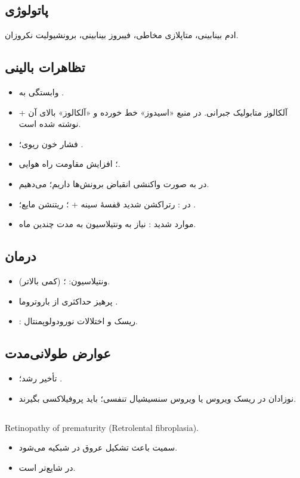 \documentclass[12pt,a4paper]{article}
\begin{document}
\subsection*{پاتولوژی }
ادم بینابینی، متاپلازی مخاطی، فیبروز بینابینی، برونشیولیت نکروزان.

\subsection*{تظاهرات بالینی }
\begin{itemize}
\item وابستگی به .
\item {} + آلکالوز متابولیک جبرانی. در منبع «اسیدوز» خط خورده و «آلکالوز» بالای آن نوشته شده است.
\item فشار خون ریوی؛ .
\item {}؛ افزایش مقاومت راه هوایی.
\item در  به صورت واکنشی انقباض برونش‌ها داریم؛  می‌دهیم.
\item در : رتراکشن شدید قفسهٔ سینه + ؛ ریتنشن مایع؛ .
\item موارد شدید : نیاز به ونتیلاسیون به مدت چندین ماه.
\end{itemize}
\subsection*{درمان }
\begin{itemize}
\item ونتیلاسیون: ؛  (کمی بالاتر).
\item پرهیز حداکثری از باروتروما .
\item {}: ریسک  و اختلالات نورودولوپمنتال.
\end{itemize}
\subsection*{عوارض طولانی‌مدت }
\begin{itemize}
\item تأخیر رشد؛ .
\item نوزادان  در ریسک ویروس  یا ویروس سنسیشیال تنفسی؛ باید پروفیلاکسی بگیرند.
\end{itemize}
\subsection*{}
\begin{latin}
Retinopathy of prematurity (Retrolental fibroplasia).
\end{latin}
\begin{itemize}
\item سمیت  باعث تشکیل عروق در شبکیه می‌شود.
\item در  شایع‌تر است.
\end{itemize}
\end{document}
